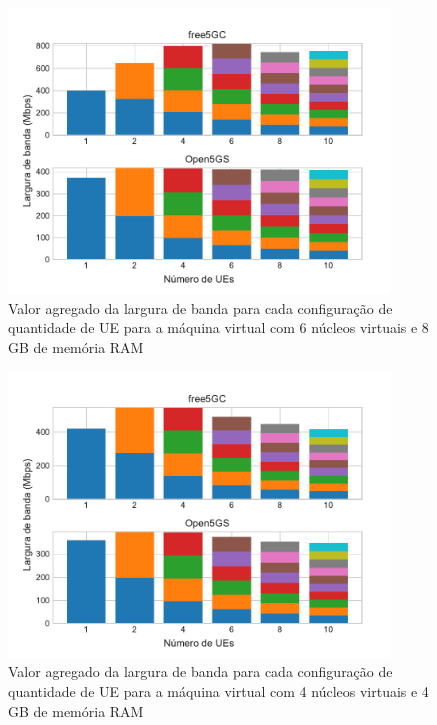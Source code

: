 \begin{figure}[!h]
    \centering
    \includegraphics[width=0.9\textwidth]{TG2/Chapters/DataAnalysis/Figures/EXP2-ALL-6C-8GB.pdf}
    \caption{Valor agregado da largura de banda para cada configuração de quantidade de UE para a máquina virtual com 6 núcleos virtuais e 8 GB de memória RAM}
    \label{fig:exp2_all_6-8}
\end{figure}

\begin{figure}[!h]
    \centering
    \includegraphics[width=0.9\textwidth]{TG2/Chapters/DataAnalysis/Figures/EXP2-ALL-4C-4GB.pdf}
    \caption{Valor agregado da largura de banda para cada configuração de quantidade de UE para a máquina virtual com 4 núcleos virtuais e 4 GB de memória RAM}
    \label{fig:exp2_all_4-4}
\end{figure}
